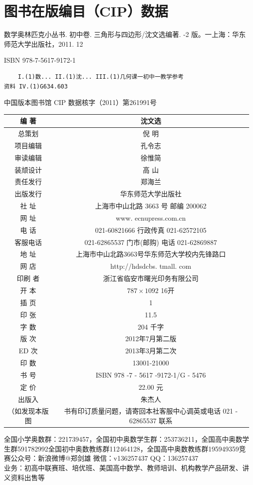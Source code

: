 \documentclass[10pt]{article}
\begin{document}
\section*{图书在版编目（CIP）数据}
数学奥林匹克小丛书. 初中卷. 三角形与四边形/沈文选编著. -2 版。一上海：华东师范大学出版社，2011. 12

ISBN 978-7-5617-9172-1

\begin{verbatim}
    I.(1)数... II.(1)沈... III.(1)几何课一初中一教学参考
资料 IV.(1)G634.603
\end{verbatim}

中国版本图书馆 CIP 数据核字（2011）第261991号

\begin{center}
\begin{tabular}{|c|c|}
\hline
编 著 & 沈文选 \\
\hline
总策划 & 倪 明 \\
\hline
项目编辑 & 孔令志 \\
\hline
审读编辑 & 徐惟简 \\
\hline
装颃设计 & 高 山 \\
\hline
责任发行 & 郑海兰 \\
\hline
出版发行 & 华东师范大学出版社 \\
\hline
社 址 & 上海市中山北路 3663 号 邮编 200062 \\
\hline
网 址 & www. ecnupress.com.cn \\
\hline
电 话 & 021-60821666 行政传真 021-62572105 \\
\hline
客服电话 & 021-62865537 门市(邮购) 电话 021-62869887 \\
\hline
地 址 & 上海市中山北路3663号华东师范大学校内先锋路口 \\
\hline
网 店 & http://hdsdcbs. tmall. com \\
\hline
印刷 者 & 浙江省临安市曙光印务有限公司 \\
\hline
开 本 & $787 \times 1092$ 16开 \\
\hline
插 页 & 1 \\
\hline
印 张 & 11.5 \\
\hline
字 数 & 204 千字 \\
\hline
版 次 & 2012年7月第二版 \\
\hline
ED 次 & 2013年3月第二次 \\
\hline
印 数 & 13001-21000 \\
\hline
书 号 & ISBN 978 -7 - 5617 -9172-1/G - 5476 \\
\hline
定 价 & 22.00 元 \\
\hline
出版入 & 朱杰人 \\
\hline
（如发现本版图 & 书有印订质量问题，请寄回本社客服中心调英或电话 021 - 62865537 联系 \\
\hline
\end{tabular}
\end{center}

全国小学奥数群：221739457，全国初中奥数学生群：253736211，全国高中奥数学生群591782992全国初中奥数教练群112464128，全国高中奥数教练群195949359竞赛公众号：新浪微博@郑剑雄 微信：v136257437 QQ：136257437\\
业务：初高中联赛班、培优班、美国高中数学、教师培训、机构教学产品研发、讲义资料出售等
\end{document}

